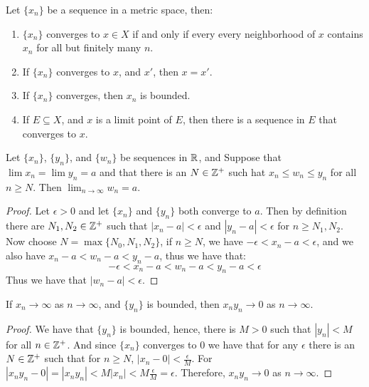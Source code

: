 \begin{theorem}\label{3.1.1}
    Let $\{x_n\}$ be a sequence in a metric space, then:
        \begin{enumerate}[label=(\arabic*)]
            \item $\{x_n\}$ converges to  $x \in X$ if and only if every every neighborhood 
                of $x$ contains  $x_n$ for all but finitely many  $n$.

            \item If  $\{x_n\}$ converges to  $x$, and  $x'$, then $x=x'$.

            \item If  $\{x_n\}$ converges, then  $x_n$ is bounded.

            \item If  $E \subseteq X$, and  $x$ is a limit point of  $E$, then there 
                is a sequence  in  $E$ that converges to  $x$.
        \end{enumerate}
\end{theorem}


\begin{theorem}\label{}
    Let $\{x_n\}$, $\{y_n\}$, and  $\{w_n\}$ be sequences in $\mathbb{R}$, and  Suppose that 
    $\lim{x_n}=\lim{y_n}=a$ and that there is an $N \in \mathbb{Z}^+$ such hat  $x_n \leq 
    w_n \leq y_n$ for all  $n \geq N$. Then  $\lim_{n \rightarrow \infty}{w_n}=a$. 
\end{theorem}
\begin{proof}
    Let $\epsilon>0$ and let  $\{x_n\}$ and  $\{y_n\}$ both converge to  $a$. Then by definition there are  $N_1,N_2 \in \mathbb{Z}^+$ 
    such that $|x_n-a|<\epsilon$ and  $|y_n-a|<\epsilon$ for  $n \geq N_1,N_2$. Now choose $N=\max\{N_0,N_1,N_2\}$, if 
    $n \geq N$, we have  $-\epsilon<x_n-a<\epsilon$, and we also have  $x_n-a<w_n-a<y_n-a$, thus we have that:
        \begin{equation*}
            -\epsilon<x_n-a<w_n-a<y_n-a<\epsilon
        \end{equation*}
    Thus we have that $|w_n-a|<\epsilon$.
\end{proof}

\begin{corollary}
    If $x_n \rightarrow \infty$ as  $n \rightarrow \infty$, and  $\{y_n\}$ is bounded, then $x_ny_n \rightarrow 0$ as 
    $n \rightarrow \infty$.
\end{corollary}
\begin{proof}
    We have that $\{y_n\}$ is bounded, hence, there is $M>0$ such that  $|y_n|<M$ for all  $n \in \mathbb{Z}^+$. And since $\{x_n\}$ 
    converges to $0$ we have that for any $\epsilon$ there is an  $N \in \mathbb{Z}^+$ such that for  $n \geq N$,  $|x_n-0|<\frac{\epsilon}{M}$.
    For $|x_ny_n-0|=|x_ny_n|<M|x_n|<M\frac{\epsilon}{M}=\epsilon$. Therefore, $x_ny_n \rightarrow 0$ as  $n \rightarrow \infty$.
\end{proof}

